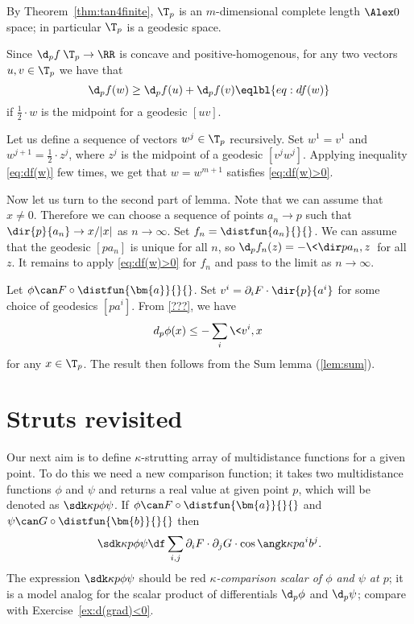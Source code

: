 By Theorem~\ref{thm:tan4finite},
$\T_p$ is an $m$-dimensional complete length $\Alex0$ space; 
in particular $\T_p$ is a geodesic space.

Since $\d_pf\:\T_p\to\RR$ is concave and positive-homogenous,
for any two vectors $u,v\in \T_p$ we have that 
\[\d_pf(w)\ge \d_pf(u) + \d_pf(v)
\eqlbl{eq:df(w)}\]
if $\tfrac12\cdot w$ is the midpoint for a geodesic $[uv]$.

Let us define a sequence of vectors $w^j\in\T_p$ recursively.
Set $w^1=v^1$ 
and $w^{j+1}=\tfrac12\cdot z^{j}$,
where $z^j$ is the midpoint of a geodesic $[v^j w^j]$.
Applying inequality \ref{eq:df(w)} few times, 
we get that $w=w^{m+1}$ satisfies \ref{eq:df(w)>0}.

Now let us turn to the second part of lemma.
Note that we can assume that $x\ne 0$.
Therefore we can choose a sequence of points $a_n\to p$ such that $\dir{p}{a_n}\to x/|x|$ as $n\to\infty$.
Set $f_n=\distfun{a_n}{}{}$.
We can assume that the geodesic $[pa_n]$ is unique for all $n$,
so $\d_pf_n(z)=-\<\dir p{a_n},z\>$ for all $z$.
It remains to apply \ref{eq:df(w)>0} for $f_n$
and pass to the limit as $n\to\infty$.
\qeds

Let $\phi\can F\circ\distfun{\bm{a}}{}{}$.
Set $v^i=\partial_i F\cdot\dir{p}{a^i}$
for some choice of geodesics $[pa^i]$.
From \ref{???}, we have
\[d_p\phi(x)\le -\sum_i\<v^i,x\>\] 
for any $x\in\T_p$.
The result then follows from the Sum lemma (\ref{lem:sum}).
\qeds


\section{Struts revisited}

Our next aim is to define
$\kappa$-strutting array of multidistance functions for a given point.
To do this we need a new comparison function;
it takes two multidistance functions $\phi$ and $\psi$ and returns a real value at given point $p$,
which will be denoted as 
$\sdk\kappa{p}{\phi}{\psi}$.
If $\phi\can F\circ\distfun{\bm{a}}{}{}$ 
and $\psi\can G\circ\distfun{\bm{b}}{}{}$
then 
$$\sdk\kappa{p}{\phi}{\psi}
\df
\sum_{i,j}\partial_iF\cdot\partial_jG\cdot \cos\angk\kappa p{a^i}{b^j}.$$
The expression $\sdk\kappa{p}{\phi}{\psi}$
should be red \emph{$\kappa$-comparison scalar of $\phi$ and $\psi$ at $p$};
it is a model analog for the scalar product of differentials $\d_p\phi$ and $\d_p\psi$;
compare with Exercise~\ref{ex:d(grad)<0}.

